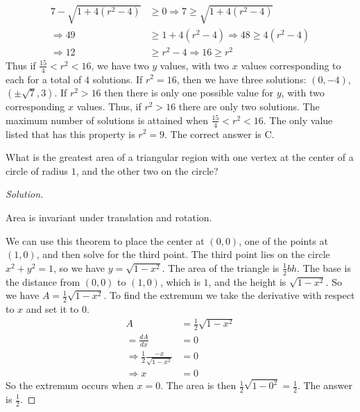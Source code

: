 \documentclass[crop=false,class=book,oneside]{standalone}                      %
\begin{document}
\begin{lexample}
                \begin{align*}
                    7-\sqrt{1+4(r^{2}-4)}&\geq 0
                    \Rightarrow 7\geq\sqrt{1+4(r^{2}-4)}\\
                    \Rightarrow 49&\geq 1+4(r^{2}-4)\Rightarrow
                    48\geq 4(r^{2}-4)\\
                    \Rightarrow 12&\geq r^{2}-4\Rightarrow 16\geq r^{2}
                \end{align*}
                Thus if $\frac{15}{4}<r^2<16$, we have two
                $y$ values, with two $x$ values corresponding
                to each for a total of $4$ solutions.
                If $r^2 = 16$, then we have three solutions:
                $(0,-4)$, $(\pm \sqrt{7},3)$. If $r^2>16$
                then there is only one possible value for
                $y$, with two corresponding $x$ values.
                Thus, if $r^2>16$ there are only two solutions.
                The maximum number of solutions is attained
                when $\frac{15}{4} < r^2 <16$. The only value
                listed that has this property is $r^2 = 9$.
                The correct answer is C.
            \end{lexample}
        \begin{problem}
            What is the greatest area of a triangular
            region with one vertex at the center of
            a circle of radius $1$, and the other
            two on the circle?
        \end{problem}
        \begin{proof}[Solution]
        \begin{theorem*}
            Area is invariant under translation
            and rotation.
        \end{theorem*}
            We can use this theorem to place the center
            at $(0,0)$, one of the points at $(1,0)$,
            and then solve for the third point. The third
            point lies on the circle $x^2+y^2 = 1$, so
            we have $y = \sqrt{1-x^2}$. The area of
            the triangle is $\frac{1}{2}bh$. The base
            is the distance from $(0,0)$ to $(1,0)$,
            which is $1$, and the height is $\sqrt{1-x^2}$.
            So we have $A = \frac{1}{2}\sqrt{1-x^2}$.
            To find the extremum we take the derivative
            with respect to $x$ and set it to $0$.
            \begin{align*}
                A&=\frac{1}{2}\sqrt{1-x^{2}}\\
                =\frac{dA}{dx}&=0\\
                \Rightarrow\frac{1}{2}\frac{-x}{\sqrt{1-x^{2}}}&=0\\
                \Rightarrow x&=0
            \end{align*}
            So the extremum occurs when $x=0$. The area is then $\frac{1}{2}\sqrt{1-0^2} = \frac{1}{2}$. The answer is $\frac{1}{2}$.
            \end{proof}
\end{document}
